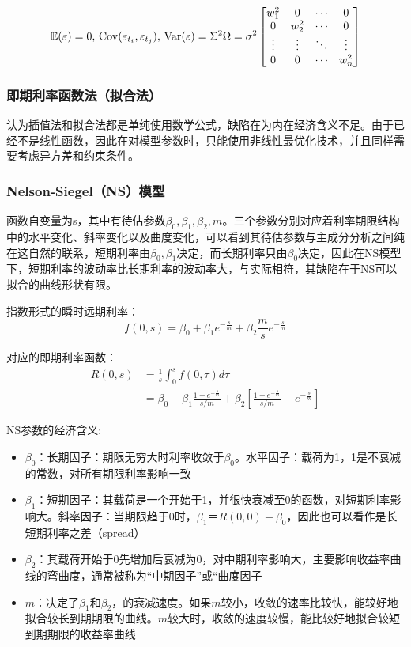 \documentclass[11pt]{article}
\begin{document}
\begin{equation*}
    \mathbb{E}(\varepsilon)=0,\,\operatorname{Cov}(\varepsilon_{t_i},\varepsilon_{t_j}),\,\operatorname{Var}(\varepsilon) = \Sigma^2\Omega = \sigma^2
    \begin{bmatrix}
        w_1^2 & 0 & \cdots & 0 \\
        0 & w_2^2 & \cdots & 0 \\
        \vdots & \vdots & \ddots & \vdots \\
        0 & 0 & \cdots & w_n^2
    \end{bmatrix}
\end{equation*}

\subsubsection{即期利率函数法（拟合法）}

认为插值法和拟合法都是单纯使用数学公式，缺陷在为内在经济含义不足。由于已经不是线性函数，因此在对模型参数时，只能使用非线性最优化技术，并且同样需要考虑异方差和约束条件。

\subsubsection*{Nelson-Siegel（NS）模型}

函数自变量为s，其中有待估参数$\beta_0,\beta_1,\beta_2,m$。三个参数分别对应着利率期限结构中的水平变化、斜率变化以及曲度变化，可以看到其待估参数与主成分分析之间纯在这自然的联系，短期利率由$\beta_0,\beta_1$决定，而长期利率只由$\beta_0$决定，因此在NS模型下，短期利率的波动率比长期利率的波动率大，与实际相符，其缺陷在于NS可以拟合的曲线形状有限。

指数形式的瞬时远期利率：
\begin{equation*}
    f(0,s)=\beta_0+\beta_1 e^{-\frac{s}{m}}+\beta_2\frac{m}{s}e^{-\frac{s}{m}}
\end{equation*}

对应的即期利率函数：
\begin{align*}
    R(0,s) &= \frac{1}{s}\int^s_0 f(0,\tau)d\tau \\
    &= \beta_0 + \beta_1 \frac{1-e^{-\frac{s}{m}}}{s/m} + \beta_2\left[\frac{1-e^{-\frac{s}{m}}}{s/m} - e^{-\frac{s}{m}}\right]
\end{align*}

NS参数的经济含义:
\begin{itemize}
    \item $\beta_0$：长期因子：期限无穷大时利率收敛于$\beta_0$。水平因子：载荷为1，1是不衰减的常数，对所有期限利率影响一致
    \item $\beta_1$：短期因子：其载荷是一个开始于1，并很快衰减至0的函数，对短期利率影响大。斜率因子：当期限趋于0时，$\beta_1＝R(0,0)-\beta_0$，因此也可以看作是长短期利率之差（spread）
    \item $\beta_2$：其载荷开始于0先增加后衰减为0，对中期利率影响大，主要影响收益率曲线的弯曲度，通常被称为“中期因子”或“曲度因子
    \item $m$：决定了$\beta_1$和$\beta_2$，的衰减速度。如果$m$较小，收敛的速率比较快，能较好地拟合较长到期期限的曲线。$m$较大时，收敛的速度较慢，能比较好地拟合较短到期期限的收益率曲线
\end{itemize}
\end{document}
